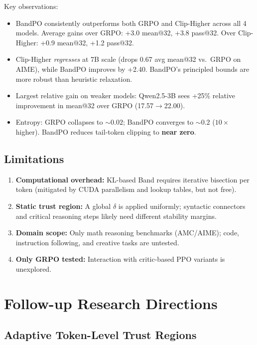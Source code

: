 \documentclass[11pt]{article}
\begin{document}
\noindent Key observations:
\begin{itemize}
    \item BandPO consistently outperforms both GRPO and Clip-Higher across all 4 models. Average gains over GRPO: +3.0 mean@32, +3.8 pass@32. Over Clip-Higher: +0.9 mean@32, +1.2 pass@32.
    \item Clip-Higher \emph{regresses} at 7B scale (drops 0.67 avg mean@32 vs.\ GRPO on AIME), while BandPO improves by +2.40. BandPO's principled bounds are more robust than heuristic relaxation.
    \item Largest relative gain on weaker models: Qwen2.5-3B sees +25\% relative improvement in mean@32 over GRPO (17.57$\to$22.00).
    \item Entropy: GRPO collapses to ${\sim}0.02$; BandPO converges to ${\sim}0.2$ ($10\times$ higher). BandPO reduces tail-token clipping to \textbf{near zero}.
\end{itemize}

\subsection{Limitations}

\begin{enumerate}
    \item \textbf{Computational overhead:} KL-based Band requires iterative bisection per token (mitigated by CUDA parallelism and lookup tables, but not free).
    \item \textbf{Static trust region:} A global $\delta$ is applied uniformly; syntactic connectors and critical reasoning steps likely need different stability margins.
    \item \textbf{Domain scope:} Only math reasoning benchmarks (AMC/AIME); code, instruction following, and creative tasks are untested.
    \item \textbf{Only GRPO tested:} Interaction with critic-based PPO variants is unexplored.
\end{enumerate}

\section{Follow-up Research Directions}

\subsection{Adaptive Token-Level Trust Regions}
\end{document}
